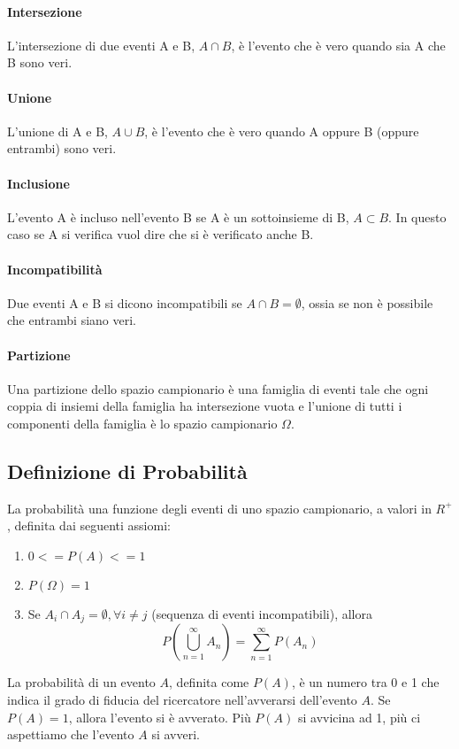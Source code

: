 \documentclass{article}
\begin{document}
\paragraph{Intersezione\\}
L'intersezione di due eventi A e B, ${A}\cap {B}$, è l'evento che è vero quando sia A che B sono veri.
\paragraph{Unione\\}
L'unione di A e B, ${A}\cup{B}$, è l'evento che è vero quando A oppure B (oppure entrambi) sono veri.
\paragraph{Inclusione\\}
L'evento A è incluso nell'evento B se A è un sottoinsieme di B, ${A}\subset{B}$. In questo caso se A si verifica vuol dire che si è verificato anche B.
\paragraph{Incompatibilità\\}
Due eventi A e B si dicono incompatibili se ${A}\cap{B}=\emptyset$, ossia se non è possibile che entrambi siano veri.
\paragraph{Partizione\\}
Una partizione dello spazio campionario è una famiglia di eventi tale che ogni coppia di insiemi della famiglia ha intersezione vuota e l'unione di tutti i componenti della famiglia è lo spazio campionario $\Omega$.
\subsection{Definizione di Probabilità}
La probabilità una funzione degli eventi di uno spazio campionario, a valori in $R^+$, definita dai seguenti assiomi:
\begin{enumerate}
\item $0<=P(A)<=1$
\item $P(\Omega)=1$
\item Se ${A_{i}}\cap{{A}_j}=\emptyset,\forall{{i}\ne{j}}$ (sequenza di eventi incompatibili), allora
  \begin{equation}
  P(\bigcup_{n=1}^{\infty}A_n) = \sum\limits_{n=1}^{\infty}P(A_n)
  \end{equation}
\end{enumerate}
La probabilità di un evento $A$, definita come $P(A)$, è un numero tra 0 e 1 che indica il grado di fiducia del ricercatore nell'avverarsi dell'evento $A$. Se $P(A)=1$, allora l'evento si è avverato. Più $P(A)$ si avvicina ad 1, più ci aspettiamo che l'evento $A$ si avveri.
\end{document}
